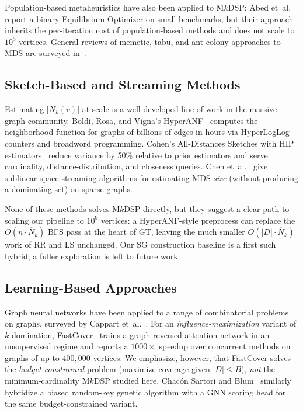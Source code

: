 \documentclass[11pt,a4paper]{article}
\newcommand{\Nk}{\overline{N}_k}
\begin{document}
Population-based metaheuristics have also been applied to M$k$DSP:
Abed et~al.~\cite{abed2025} report a binary Equilibrium Optimizer on
small benchmarks, but their approach inherits the per-iteration cost
of population-based methods and does not scale to $10^5$ vertices.
General reviews of memetic, tabu, and ant-colony approaches to MDS
are surveyed in~\cite{haynes1998}.

\subsection{Sketch-Based and Streaming Methods}
\label{sec:related:sketch}

Estimating $|N_k(v)|$ at scale is a well-developed line of work in the
massive-graph community. Boldi, Rosa, and Vigna's
HyperANF~\cite{boldi2011} computes the neighborhood function for
graphs of billions of edges in hours via HyperLogLog counters and
broadword programming. Cohen's All-Distances Sketches with HIP
estimators~\cite{cohen2015} reduce variance by 50\% relative to prior
estimators and serve cardinality, distance-distribution, and
closeness queries. Chen et~al.~\cite{chen2023} give sublinear-space
streaming algorithms for estimating MDS \emph{size} (without producing
a dominating set) on sparse graphs.

None of these methods solves M$k$DSP directly, but they suggest a
clear path to scaling our pipeline to $10^9$ vertices: a HyperANF-style
preprocess can replace the $O(n\cdot\Nk)$ BFS pass at the heart of GT,
leaving the much smaller $O(|D|\cdot\Nk)$ work of RR and LS unchanged.
Our SG construction baseline is a first such hybrid; a fuller
exploration is left to future work.

\subsection{Learning-Based Approaches}

Graph neural networks have been applied to a range of combinatorial
problems on graphs, surveyed by Cappart
et~al.~\cite{cappart2023}. For an \emph{influence-maximization} variant
of $k$-domination, FastCover~\cite{ni2021} trains a graph
reversed-attention network in an unsupervised regime and reports a
$1000\times$ speedup over concurrent methods on graphs of up to
$400{,}000$ vertices. We emphasize, however, that FastCover solves the
\emph{budget-constrained} problem (maximize coverage given $|D|\le B$),
\emph{not} the minimum-cardinality M$k$DSP studied here. Chac{\'o}n
Sartori and Blum~\cite{chacon2022} similarly hybridize a biased
random-key genetic algorithm with a GNN scoring head for the same
budget-constrained variant.
\end{document}

